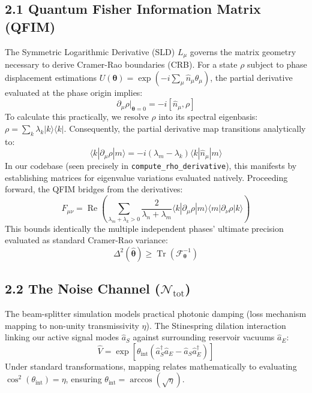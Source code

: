 \documentclass[12pt]{article}
\begin{document}
\subsection*{2.1 Quantum Fisher Information Matrix (QFIM)}
The Symmetric Logarithmic Derivative (SLD) $L_{\mu}$ governs the matrix geometry necessary to derive Cramer-Rao boundaries (CRB). For a state $\rho$ subject to phase displacement estimations $U(\boldsymbol{\theta}) = \exp(-i \sum_{\mu} \hat{n}_{\mu} \theta_{\mu})$, the partial derivative evaluated at the phase origin implies:
\begin{equation}
    \partial_\mu \rho \Big|_{\boldsymbol{\theta} = 0} = -i [\hat{n}_\mu, \rho]
\end{equation}
To calculate this practically, we resolve $\rho$ into its spectral eigenbasis: $\rho = \sum_k \lambda_k |k\rangle\langle k|$. Consequently, the partial derivative map transitions analytically to:
\begin{equation}
    \langle k | \partial_\mu \rho | m \rangle = -i(\lambda_m - \lambda_k)\langle k | \hat{n}_\mu | m \rangle
\end{equation}
In our codebase (seen precisely in \texttt{compute\_rho\_derivative}), this manifests by establishing matrices for eigenvalue variations evaluated natively. Proceeding forward, the QFIM bridges from the derivatives:
\begin{equation}
    F_{\mu\nu} = \operatorname{Re}\left(  \sum_{\lambda_m + \lambda_k > 0} \frac{2}{\lambda_n + \lambda_m} \langle k| \partial_\mu \rho |m\rangle \langle m| \partial_\nu \rho | k\rangle \right)
\end{equation}
This bounds identically the multiple independent phases' ultimate precision evaluated as standard Cramer-Rao variance:
\begin{equation}
    \Delta^2 (\hat{\boldsymbol{\theta}}) \geq \operatorname{Tr}\left(\mathcal{F}^{-1}_{\boldsymbol{\theta}}\right)
\end{equation}

\subsection*{2.2 The Noise Channel ($\mathcal{N}_{\text{tot}}$)}
The beam-splitter simulation models practical photonic damping (loss mechanism mapping to non-unity transmissivity $\eta$). The Stinespring dilation interaction linking our active signal modes $\hat{a}_S$ against surrounding reservoir vacuums $\hat{a}_E$:
\begin{equation}
    \hat{V} = \exp\left[\theta_{\text{int}}\left( \hat{a}_S^\dagger \hat{a}_E - \hat{a}_S \hat{a}_E^\dagger \right)\right] 
\end{equation}
Under standard transformations, mapping relates mathematically to evaluating $\cos^2(\theta_{\text{int}}) = \eta$, ensuring $\theta_{\text{int}} = \arccos(\sqrt{\eta})$. 
\end{document}
